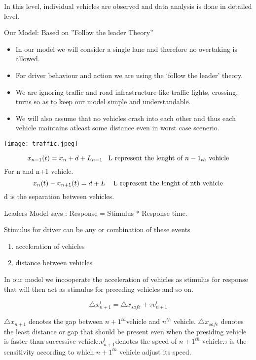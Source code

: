\documentclass[12pt, letterpaper]{article}
\begin{document}
In this level, individual vehicles are observed and data analysis is done in detailed level.

Our Model: Based on ''Follow the leader Theory''
\begin{itemize}
\item In our model we will consider a single lane and therefore no overtaking is allowed.
\item For driver behaviour and action we are using the `follow the leader' theory.
\item We are ignoring  traffic and road infrastructure like traffic lights, crossing, turns so as to keep our model simple and understandable.
\item We will also assume that no vehicles crash into each other and thus each vehicle maintains atleast some distance even in worst case scenerio.
\end{itemize}

\newpage
\texttt{[image: traffic.jpeg]}



\begin{equation}
x_{n-1} (t)= x_{n} + d + L_{n-1}      \textrm{\hspace{5pt} L represent the lenght of $n-1_{th}$ vehicle}
\end{equation} 
For n and n+1 vehicle.
\begin{equation}
x_n (t) - x_{n+1} (t) = d + L    \textrm{ \hspace{5pt} L represent the lenght of nth vehicle}
\end{equation} 
d is the separation between vehicles.

Leaders Model says :  Response  = Stimulus * Response time.

Stimulus for driver can be any or combination of these events
\begin{enumerate}
\item acceleration of vehicles
\item distance between vehicles
\end{enumerate}

In our model we incooperate the acceleration of vehicles as stimulus for response that will then act as stimulus for preceding vehicles and so on.

\begin{equation}
 \triangle x_{n+1} ^t = \triangle x_{safe} + \tau v_{n+1 }^t
 \end{equation}
 
$\triangle x_{n+1}$  denotes the gap between $ n+1^{th} $vehicle and $ n^{th}$ vehicle.
 $\triangle x_{safe}$
  denotes the least distance or gap that should be present even when the presiding vehicle is faster than successive vehicle.$v_{n+1} ^t $denotes the speed of $ n+1^{th}$ vehicle.$\tau$ is the sensitivity according to which $n+1^{th}$ vehicle adjust its speed.
 
\end{document}
